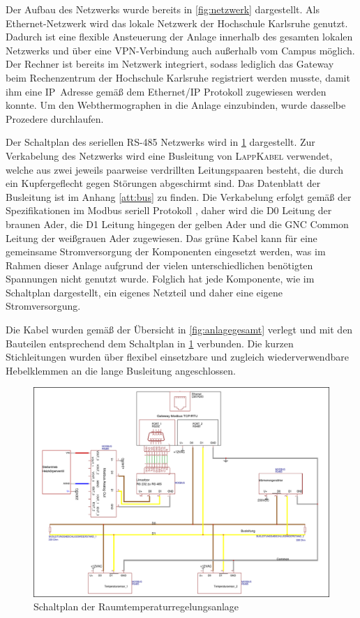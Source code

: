Der Aufbau des Netzwerks wurde bereits in \ref{fig:netzwerk} dargestellt. Als Ethernet-Netzwerk wird das lokale Netzwerk der Hochschule Karlsruhe genutzt. Dadurch ist eine flexible Ansteuerung der Anlage innerhalb des gesamten lokalen Netzwerks und über eine VPN-Verbindung auch außerhalb vom Campus möglich. Der Rechner ist bereits im Netzwerk integriert, sodass lediglich das Gateway beim Rechenzentrum der Hochschule Karlsruhe registriert werden musste, damit ihm eine IP~Adresse gemäß dem Ethernet/IP Protokoll zugewiesen werden konnte.
Um den Webthermographen in die Anlage einzubinden, wurde dasselbe Prozedere durchlaufen.

Der Schaltplan des seriellen RS-485 Netzwerks wird in \ref{fig:schaltplan} dargestellt. Zur Verkabelung des Netzwerks wird eine Busleitung von \textsc{LappKabel} verwendet, welche aus zwei jeweils paarweise verdrillten Leitungspaaren
besteht, die durch ein Kupfergeflecht gegen Störungen abgeschirmt sind. Das Datenblatt der Busleitung ist im Anhang \ref{att:bus} zu finden.
Die Verkabelung erfolgt gemäß der Spezifikationen im Modbus seriell Protokoll \cite{mod06ser}, daher wird die D0 Leitung der braunen Ader, die D1 Leitung hingegen der gelben Ader und die GNC Common Leitung der weißgrauen Ader zugewiesen. Das grüne Kabel kann für eine gemeinsame Stromversorgung der Komponenten eingesetzt werden, was im Rahmen dieser Anlage aufgrund der vielen unterschiedlichen benötigten Spannungen nicht genutzt wurde. Folglich hat jede Komponente, wie im Schaltplan dargestellt, ein eigenes Netzteil und daher eine eigene Stromversorgung. 

Die Kabel wurden gemäß der Übersicht in \ref{fig:anlagegesamt} verlegt und mit den Bauteilen entsprechend dem Schaltplan in \ref{fig:schaltplan} verbunden. Die kurzen Stichleitungen wurden über flexibel einsetzbare und zugleich wiederverwendbare Hebelklemmen an die lange Busleitung angeschlossen.


\begin{figure}
\centering
\includegraphics[width=\textwidth]{abbildungen/20160326_schaltplan}
\caption{Schaltplan der Raumtemperaturregelungsanlage}
\label{fig:schaltplan}
\end{figure}


